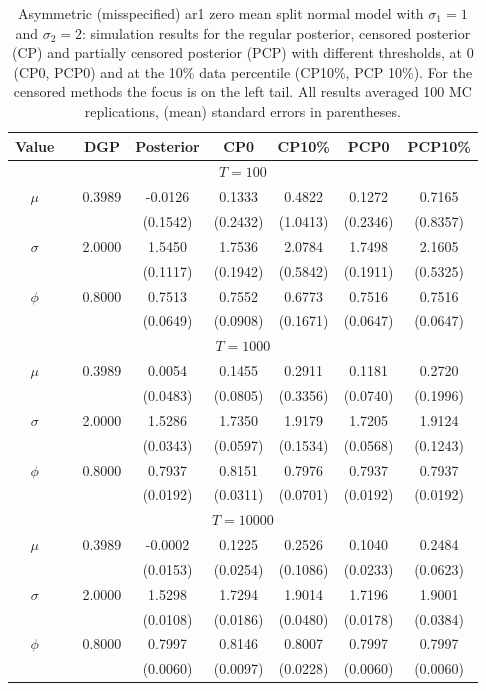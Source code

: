 { \renewcommand{\arraystretch}{1.2} 
{\footnotesize 
\begin{table} 
\center 
\begin{tabular}{cc cccccc} 
Value & & DGP & Posterior & CP0  & CP10\% & PCP0  & PCP10\% \\ \hline 
\hline 
\multicolumn{8}{c}{$T =100$}  \\ 
\hline 
\rowcolor{LightCyan} 
$\mu$&& 0.3989 & -0.0126 & 0.1333 & 0.4822 & 0.1272 & 0.7165 \\ 
&&   & (0.1542) & (0.2432) & (1.0413) & (0.2346) & (0.8357) \\ [1ex]
\rowcolor{LightCyan} 
$\sigma$&& 2.0000 & 1.5450 & 1.7536 & 2.0784 & 1.7498 & 2.1605 \\ 
&&   & (0.1117) & (0.1942) & (0.5842) & (0.1911) & (0.5325) \\ [1ex]
\rowcolor{LightCyan} 
$\phi$&& 0.8000 & 0.7513 & 0.7552 & 0.6773 & 0.7516 & 0.7516 \\ 
&&   & (0.0649) & (0.0908) & (0.1671) & (0.0647) & (0.0647) \\ [1ex]
\hline 
\multicolumn{8}{c}{$T =1000$}  \\ 
\hline 
\rowcolor{LightCyan} 
$\mu$&& 0.3989 & 0.0054 & 0.1455 & 0.2911 & 0.1181 & 0.2720 \\ 
&&   & (0.0483) & (0.0805) & (0.3356) & (0.0740) & (0.1996) \\ [1ex]
\rowcolor{LightCyan} 
$\sigma$&& 2.0000 & 1.5286 & 1.7350 & 1.9179 & 1.7205 & 1.9124 \\ 
&&   & (0.0343) & (0.0597) & (0.1534) & (0.0568) & (0.1243) \\ [1ex]
\rowcolor{LightCyan} 
$\phi$&& 0.8000 & 0.7937 & 0.8151 & 0.7976 & 0.7937 & 0.7937 \\ 
&&   & (0.0192) & (0.0311) & (0.0701) & (0.0192) & (0.0192) \\ [1ex]
\hline 
\multicolumn{8}{c}{$T =10000$}  \\ 
\hline 
\rowcolor{LightCyan} 
$\mu$&& 0.3989 & -0.0002 & 0.1225 & 0.2526 & 0.1040 & 0.2484 \\ 
&&   & (0.0153) & (0.0254) & (0.1086) & (0.0233) & (0.0623) \\ [1ex]
\rowcolor{LightCyan} 
$\sigma$&& 2.0000 & 1.5298 & 1.7294 & 1.9014 & 1.7196 & 1.9001 \\ 
&&   & (0.0108) & (0.0186) & (0.0480) & (0.0178) & (0.0384) \\ [1ex]
\rowcolor{LightCyan} 
$\phi$&& 0.8000 & 0.7997 & 0.8146 & 0.8007 & 0.7997 & 0.7997 \\ 
&&   & (0.0060) & (0.0097) & (0.0228) & (0.0060) & (0.0060) \\ [1ex]
\hline 
\end{tabular}
 \caption{Asymmetric (misspecified) ar1 zero mean split normal model with $\sigma_{1} = 1$ and $\sigma_{2} = 2$:  simulation results for the regular posterior, censored posterior (CP)  and partially censored posterior (PCP) with different thresholds,  at $0$ (CP0, PCP0) and at the 10\% data percentile (CP10\%, PCP 10\%).  For the censored methods the focus is on the left tail.  All results averaged 100 MC replications, (mean) standard errors in parentheses.} 
\label{tab:ar1_s2_pcp_est}  
\end{table}
}}